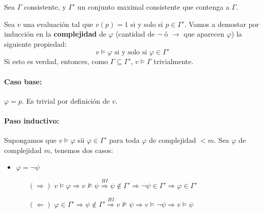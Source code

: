 \begin{demo}
	Sea $\Gamma$ consistente, y $\Gamma'$ un conjunto maximal consistente que contenga a $\Gamma$.
	
	Sea $v$ una evaluación tal que $v(p) = 1$ si y solo si $p\in\Gamma'$. Vamos a demostar por inducción en la  \textbf{complejidad} de $\varphi$ (cantidad de $\lnot$ ó $\to$ que aparecen $\varphi$) la siguiente propiedad:
	$$v\vDash\varphi \text{ si y solo si } \varphi\in\Gamma'$$
	Si esto es verdad, entonces, como $\Gamma\subseteq\Gamma'$, $v\vDash\Gamma$ trivialmente.
	\paragraph{Caso base:} $\varphi=p$. Es trivial por definición de $v$.
	\paragraph{Paso inductivo:} Supongamos que $v\vDash\varphi$ sii $\varphi\in\Gamma'$ para toda $\varphi$ de complejidad $< m$. Sea $\varphi$ de complejidad $m$, tenemos dos casos:

	\begin{itemize}
		\item $\varphi=\lnot\psi$ 
		\begin{itemize}
			\item[$(\Rightarrow)$] $v\vDash\varphi\Rightarrow v\nvDash\psi\overset{HI}{\Rightarrow} \psi\notin\Gamma' \Rightarrow \lnot\psi\in\Gamma' \Rightarrow \varphi\in\Gamma'$
						\item[$(\Leftarrow)$] $\varphi \in\Gamma' \Rightarrow \psi\notin\Gamma'\overset{HI}{\Rightarrow} v\nvDash\psi \Rightarrow v\vDash\lnot\psi\Rightarrow v\vDash\psi$
		\end{itemize}
	\end{itemize}
		\end{demo}
